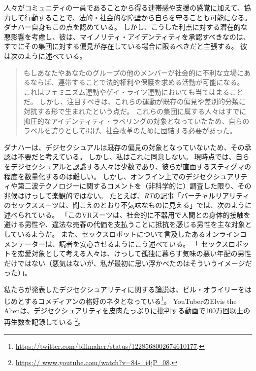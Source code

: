 \documentclass[paper=a4,book,openany]{jlreq}
\begin{document}
人々がコミュニティの一員であることから得る連帯感や支援の感覚に加えて、協力して行動することで、法的・社会的な障壁から自らを守ることも可能になる。
ダナハー自身もこの点を認めている。
しかし、こうした利点に対する潜在的な悪影響を考慮し、彼は、マイノリティ・アイデンティティを承認すべきなのは、すでにその集団に対する偏見が存在している場合に限るべきだと主張する。
彼は次のように述べている。

\begin{quote}
もしあなたやあなたのグループの他のメンバーが社会的に不利な立場にあるならば、連帯することで法的権利や保護を求める活動が可能になる。
これはフェミニズム運動やゲイ・ライツ運動においても当てはまることだ。
しかし、注目すべきは、これらの運動が既存の偏見や差別的分類に対抗する形で生まれたという点だ。
これらの集団に属する人々はすでに抑圧的なアイデンティティ・ラベリングの対象となっていたため、自らのラベルを誇りとして掲げ、社会改革のために団結する必要があった。
\citep[p.395]{danaher20:_sexual}

\end{quote}

ダナハーは、デジセクシュアルは既存の偏見の対象となっていないため、その承認は不要だと考えている。
しかし、私はこれに同意しない。
現時点では、自らをデジセクシュアルと認識する人々は少数であり、彼らが直面するスティグマの程度を数量化するのは難しい。
しかし、オンライン上でのデジセクシュアリティや第二波テクノロジーに関するコメントを（非科学的に）調査した限り、その兆候はけっして楽観的ではない。
たとえば、\emph{RT}の記事「バーチャルリアリティのセックススーツは、聞こえのとおり不気味なものに見える」では、次のように述べられている。
「このVRスーツは、社会的に不器用で人間との身体的接触を避ける男性や、違法な売春の代価を支払うことに抵抗を感じる男性を主な対象としているようだ\citep{rt16:_virtual_realit_sex_suit_looks}。
また、セックスロボットについて言及したあるオンラインコメンテーターは、読者を安心させるようにこう述べている。
「 セックスロボットを恋愛対象として考える人々は、けっして孤独に暮らす気味の悪い年配の男性だけではない（悪気はないが、私が最初に思い浮かべたのはそういうイメージだった）」\citep{richmond18:_rise_sex_robot}。

私たちが発表したデジセクシュアリティに関する論説は、ビル・オライリーをはじめとするコメディアンの格好のネタとなっている\footnote{\url{https://twitter.com/billmaher/status/1228568002674610177}.}。
YouTuberのElvis the Alienは、デジセクシュアリティを皮肉たっぷりに批判する動画で100万回以上の再生数を記録している
\footnote{\url{https:// www.youtube.com/watch?v=84-_i4jP_08}.}。
\end{document}
